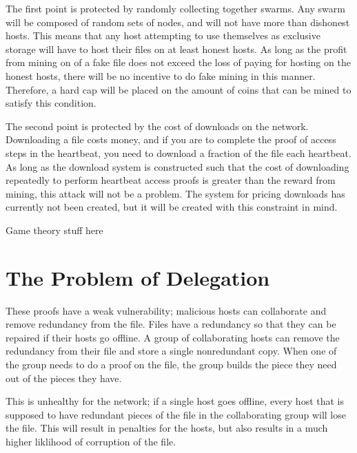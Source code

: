 \documentclass[twocolumn]{article}
\begin{document}
The first point is protected by randomly collecting together swarms.
Any swarm will be composed of random sets of nodes, and will not have more than \maxcorruption{} dishonest hosts.
This means that any host attempting to use themselves as exclusive storage will have to host their files on at least \inversemaxcorruption{} honest hosts.
As long as the profit from mining on \maxcorruption{} of a fake file does not exceed the loss of paying for hosting on the \inversemaxcorruption honest hosts, there will be no incentive to do fake mining in this manner.
Therefore, a hard cap will be placed on the amount of coins that can be mined to satisfy this condition.

The second point is protected by the cost of downloads on the network.
Downloading a file costs money, and if you are to complete the proof of access steps in the heartbeat, you need to download a fraction of the file each heartbeat.
As long as the download system is constructed such that the cost of downloading repeatedly to perform heartbeat access proofs is greater than the reward from mining, this attack will not be a problem.
The system for pricing downloads has currently not been created, but it will be created with this constraint in mind.

\begin{center}
Game theory stuff here
\end{center}

\section{The Problem of Delegation}

These proofs have a weak vulnerability; malicious hosts can collaborate and remove redundancy from the file.
Files have a redundancy so that they can be repaired if their hosts go offline.
A group of collaborating hosts can remove the redundancy from their file and store a single nonredundant copy.
When one of the group needs to do a proof on the file, the group builds the piece they need out of the pieces they have.

This is unhealthy for the network; if a single host goes offline, every host that is supposed to have redundant pieces of the file in the collaborating group will lose the file.
This will result in penalties for the hosts, but also results in a much higher liklihood of corruption of the file.
\end{document}
